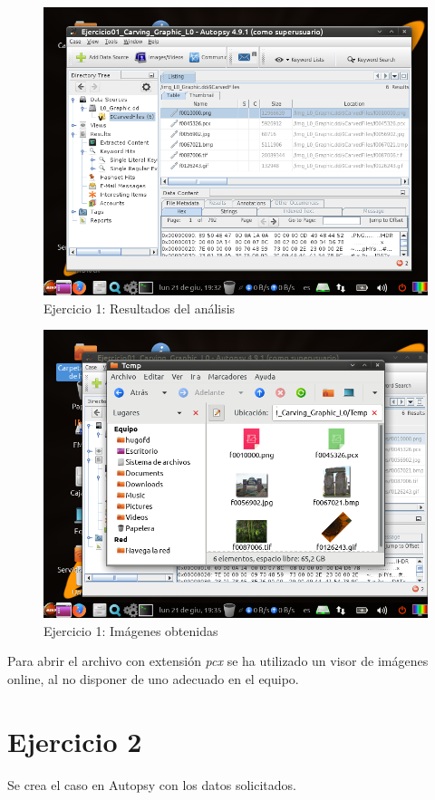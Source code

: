 \documentclass[11pt]{article}
\begin{document}
\begin{figure}[H]
  \caption{Ejercicio 1: Resultados del análisis}
  \centering
  \includegraphics[scale=0.7]{e1-5.png}
\end{figure}

\begin{figure}[H]
  \caption{Ejercicio 1: Imágenes obtenidas}
  \centering
  \includegraphics[scale=0.7]{e1-6.png}
\end{figure}

Para abrir el archivo con extensión \textit{pcx} se ha utilizado un visor de imágenes online, al no disponer de uno adecuado en el equipo.

\section{Ejercicio 2}
Se crea el caso en Autopsy con los datos solicitados.
\end{document}
